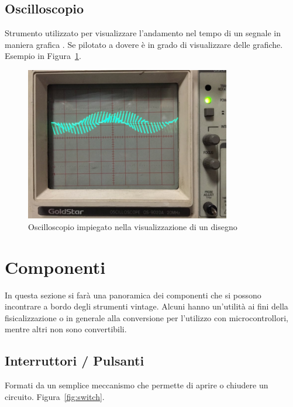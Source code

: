 \documentclass[12pt,a4paper]{report}
\begin{document}
\subsection{Oscilloscopio}
Strumento utilizzato per visualizzare l'andamento nel tempo di un segnale in maniera grafica \cite{itwiki:120862120}. Se pilotato a dovere è in grado di
visualizzare delle grafiche. Esempio in Figura~\ref{fig:oscilloscopio}.

\begin{figure}[h]
  \centering
  \includegraphics[width=0.8\textwidth]{oscilloscopio}
  \caption{Oscilloscopio impiegato nella visualizzazione di un disegno \cite{instructablesoscilloscope}}
  \label{fig:oscilloscopio}
\end{figure}

\section{Componenti}
In questa sezione si farà una panoramica dei componenti che si possono incontrare a bordo degli strumenti vintage. Alcuni hanno
un'utilità ai fini della fisicalizzazione o in generale alla conversione per l'utilizzo con microcontrollori, mentre altri non sono convertibili.



\subsection{Interruttori / Pulsanti}
Formati da un semplice meccanismo che permette di aprire o chiudere un circuito. Figura~\ref{fig:switch}.
\end{document}
